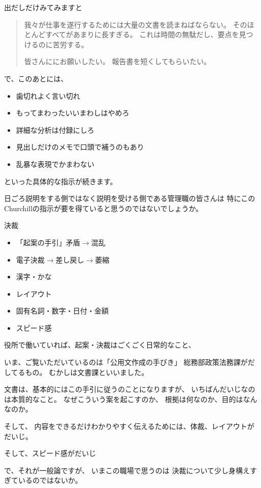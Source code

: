 \documentclass[uplatex,jis2004,dvipdfmx,12pt]{jsarticle}
\begin{document}
出だしだけみてみますと

\begin{quote}
我々が仕事を遂行するためには大量の文書を読まねばならない。
そのほとんどすべてがあまりに長すぎる。
これは時間の無駄だし、要点を見つけるのに苦労する。

皆さんににお願いしたい。
報告書を短くしてもらいたい。
\end{quote}

で、このあとには、
\begin{itemize}
 \item 歯切れよく言い切れ
 \item もってまわったいいまわしはやめろ
 \item 詳細な分析は付録にしろ
 \item 見出しだけのメモで口頭で補うのもあり
 \item 乱暴な表現でかまわない
\end{itemize}
といった具体的な指示が続きます。


日ごろ説明をする側ではなく説明を受ける側である管理職の皆さんは
特にこのChurchillの指示が要を得ていると思うのではないでしょうか。


決裁
       \begin{itemize}
	\item 「起案の手引」矛盾$\longrightarrow${}混乱
	\item 電子決裁$\longrightarrow${}差し戻し$\longrightarrow${}萎縮
	\item 漢字・かな
	\item レイアウト
	\item 固有名詞・数字・日付・金額
	\item スピード感
   \end{itemize}
\fi


役所で働いていれば、起案・決裁はごくごく日常的なこと、

いま、ご覧いただいているのは「公用文作成の手びき」
総務部政策法務課がだしてるもの。
むかしは文書課といいました。


文書は、基本的にはこの手引に従うのことになりますが、
いちばんだいじなのは本質的なこと。
なぜこういう案を起こすのか、
根拠は何なのか、目的はなんなのか。

そして、
内容をできるだけわかりやすく伝えるためには、体裁、レイアウトがだいじ。

そして、スピード感がだいじ

で、それが一般論ですが、
いまこの職場で思うのは
決裁について少し身構えすぎているのではないか。
\end{document}
